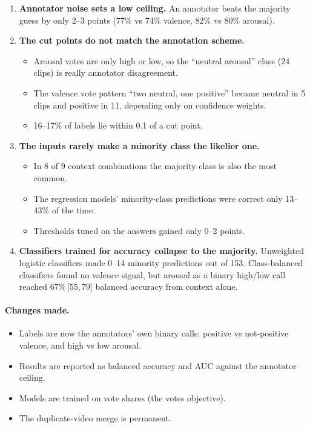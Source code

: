 \documentclass[11pt]{article}
\newcommand{\ci}[2]{\,[#1,\,#2]}
\begin{document}
\begin{enumerate}
  \item \textbf{Annotator noise sets a low ceiling.} An annotator beats the majority guess by only 2--3 points (77\% vs 74\% valence, 82\% vs 80\% arousal).
  \item \textbf{The cut points do not match the annotation scheme.}
  \begin{itemize}
    \item Arousal votes are only high or low, so the ``neutral arousal'' class (24 clips) is really annotator disagreement.
    \item The valence vote pattern ``two neutral, one positive'' became neutral in 5 clips and positive in 11, depending only on confidence weights.
    \item 16--17\% of labels lie within 0.1 of a cut point.
  \end{itemize}
  \item \textbf{The inputs rarely make a minority class the likelier one.}
  \begin{itemize}
    \item In 8 of 9 context combinations the majority class is also the most common.
    \item The regression models' minority-class predictions were correct only 13--43\% of the time.
    \item Thresholds tuned on the answers gained only 0--2 points.
  \end{itemize}
  \item \textbf{Classifiers trained for accuracy collapse to the majority.} Unweighted logistic classifiers made 0--14 minority predictions out of 153. Class-balanced classifiers found no valence signal, but arousal as a binary high/low call reached 67\%\ci{55}{79} balanced accuracy from context alone.
\end{enumerate}

\paragraph{Changes made.}
\begin{itemize}
  \item Labels are now the annotators' own binary calls: positive vs not-positive valence, and high vs low arousal.
  \item Results are reported as balanced accuracy and AUC against the annotator ceiling.
  \item Models are trained on vote shares (the votes objective).
  \item The duplicate-video merge is permanent.
\end{itemize}
\end{document}
